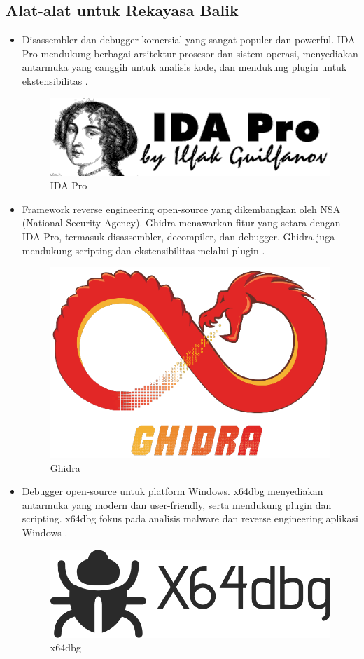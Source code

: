 \subsection{Alat-alat untuk Rekayasa Balik}
\begin{itemize}
	\item {} Disassembler dan debugger komersial yang sangat populer dan powerful. IDA Pro mendukung berbagai arsitektur prosesor dan sistem operasi, menyediakan antarmuka yang canggih untuk analisis kode, dan mendukung plugin untuk ekstensibilitas \cite{Hex91}.
	      \begin{figure}
		      \centering
		      \includegraphics[width=.6\textwidth]
		      {assets/pics/IDA_pro.png}
		      \caption{IDA Pro \cite{Hex91}}
	      \end{figure}
	\item {} Framework reverse engineering open-source yang dikembangkan oleh NSA (National Security Agency). Ghidra menawarkan fitur yang setara dengan IDA Pro, termasuk disassembler, decompiler, dan debugger. Ghidra juga mendukung scripting dan ekstensibilitas melalui plugin \cite{Nat19}.
	      \begin{figure}
		      \centering
		      \includegraphics[width=.4\textwidth]
		      {assets/pics/Ghidra.png}
		      \caption{Ghidra \cite{Nat19}}
	      \end{figure}
	\item {} Debugger open-source untuk platform Windows. x64dbg menyediakan antarmuka yang modern dan user-friendly, serta mendukung plugin dan scripting. x64dbg fokus pada analisis malware dan reverse engineering aplikasi Windows \cite{Dun14}.
	      \begin{figure}
		      \centering
		      \includegraphics[width=.5\textwidth]
		      {assets/pics/x64Dbg.png}
		      \caption{x64dbg \cite{Dun14}}
	      \end{figure}
\end{itemize}

